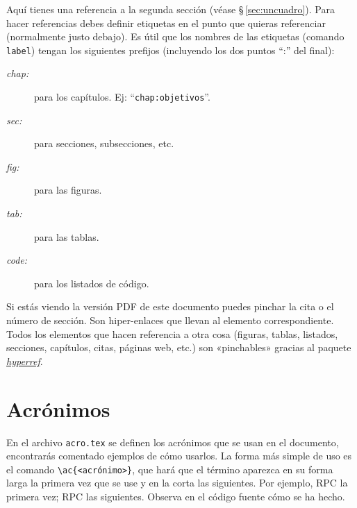 Aquí tienes una referencia a la segunda sección (véase \S\,\ref{sec:uncuadro}). Para hacer referencias debes definir etiquetas en el punto que quieras referenciar (normalmente justo debajo). Es útil que los nombres de las etiquetas (comando \texttt{label}) tengan los siguientes prefijos (incluyendo los dos puntos ``:'' del final):

\begin{description}
  \item[\emph{chap:}] para los capítulos. Ej: ``\texttt{chap:objetivos}''.
  \item[\emph{sec:}] para secciones, subsecciones, etc.
  \item[\emph{fig:}] para las figuras.
  \item[\emph{tab:}] para las tablas.
  \item[\emph{code:}] para los listados de código.
\end{description}

Si estás viendo la versión PDF de este documento puedes pinchar la cita o el número de sección. Son hiper-enlaces que llevan al elemento correspondiente. Todos los elementos que hacen referencia a otra cosa (figuras, tablas, listados, secciones, capítulos, citas, páginas web, etc.) son «pinchables» gracias al paquete \href{http://latex.tugraz.at/_media/docs/hyperref.pdf}{\emph{hyperref}}.

\section{Acrónimos}
En el archivo \texttt{acro.tex} se definen los acrónimos que se usan en el documento, encontrarás comentado ejemplos de cómo usarlos. La forma más simple de uso es el comando \texttt{\textbackslash ac\{<acrónimo>\}}, que hará que el término aparezca en su forma larga la primera vez que se use y en la corta las siguientes. Por ejemplo, \ac{RPC} la primera vez; \ac{RPC} las siguientes. Observa en el código fuente cómo se ha hecho.



